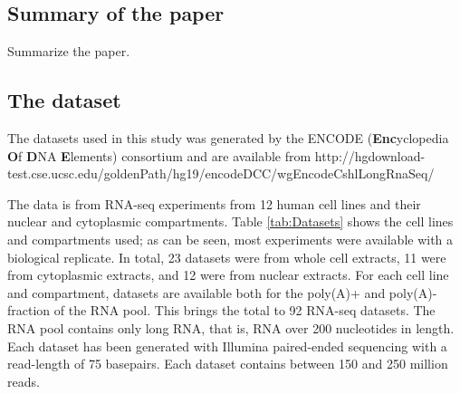 %








\subsection{Summary of the paper}
Summarize the paper.

\subsection{The dataset}
The datasets used in this study was generated by the ENCODE
(\textbf{Enc}yclopedia \textbf{O}f \textbf{D}NA \textbf{E}lements) consortium
and are available from http://hgdownload-test.cse.ucsc.edu/goldenPath/hg19/encodeDCC/wgEncodeCshlLongRnaSeq/

The data is from RNA-seq experiments from 12 human cell lines and their
nuclear and cytoplasmic compartments. Table \ref{tab:Datasets} shows the cell
lines and compartments used; as can be seen, most experiments were available
with a biological replicate. In total, 23 datasets were from whole cell
extracts, 11 were from cytoplasmic extracts, and 12 were from nuclear extracts.
For each cell line and compartment, datasets are available both for the
poly(A)+ and poly(A)- fraction of the RNA pool. This brings the total to 92
RNA-seq datasets. The RNA pool contains only long RNA, that is, RNA over 200
nucleotides in length. Each dataset has been generated with Illumina
paired-ended sequencing with a read-length of 75 basepairs. Each dataset
contains between 150 and 250 million reads.

